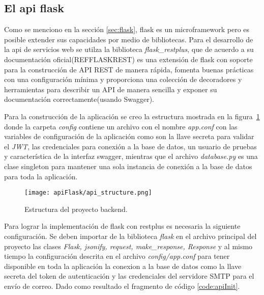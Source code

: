 \subsection{El api flask} \label{sec:apiFlask}

Como se menciono en la sección \ref{sec:flask}, flask es un microframework pero es posible extender sus capacidades por medio de bibliotecas. Para el desarrollo de la api de servicios web se utilza la biblioteca \textit{flask_restplus}, que de acuerdo a su documentación oficial(REFFLASKREST) es una extensión de flask con soporte para la construcción de API REST de manera rápida, fomenta buenas prácticas con una configuración mínima y proporciona una colección de decoradores y herramientas para describir un API de manera sencilla y exponer su documentación correctamente(usando Swagger).

Para la construcción de la aplicación se creo la estructura mostrada en la figura~\ref{img:apiStructure} donde la carpeta \textit{config} contiene un archivo con el nombre \textit{app.conf} con las variables de configuración de la aplicación como son la llave secreta para validar el \textit{JWT}, las credenciales para conexión a la base de datos, un usuario de pruebas y característica de la interfaz swagger, mientras que el archivo \textit{database.py} es una clase singleton para mantener una sola instancia de conexión a la base de datos para toda la aplicación.

\begin{figure}[H]
  \centering
  \texttt{[image: apiFlask/api\_structure.png]}
  \caption{Estructura del proyecto backend.}
  \label{img:apiStructure}
\end{figure}

Para lograr la implementación de flask con restplus es necesaria la siguiente configuración. Se deben importar de la biblioteca \textit{flask } en el archivo principal del proyecto las clases \textit{Flask, jsonify, request, make\_response, Response} y al mismo tiempo la configuración descrita en el archivo \textit{config/app.conf} para tener disponible en toda la aplicación la conexion a la base de datos como la llave secreta del token de autenticación y las credenciales del servidore SMTP para el envío de correo. Dado como resultado el fragmento de código \ref{code:apiInit}.

